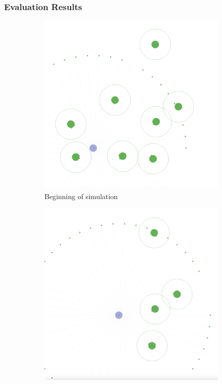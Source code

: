 \documentclass{scrartcl}
\begin{document}
\subsubsection{Evaluation Results}

\begin{figure}
  \centering
  \begin{subfigure}[b]{0.45\textwidth}
      \centering
      \includegraphics[width=\textwidth]{img/1_agent_1.png}
      \caption{Beginning of simulation}
  \end{subfigure}
  \hfill
  \begin{subfigure}[b]{0.45\textwidth}
      \centering
      \includegraphics[width=\textwidth]{img/1_agent_2.png}

\end{subfigure}
\end{figure}
\end{document}
